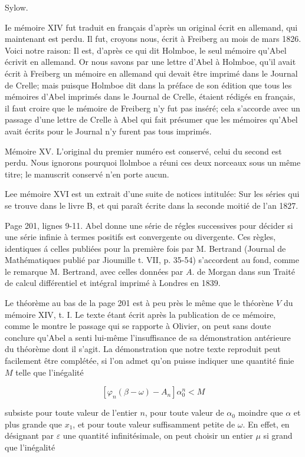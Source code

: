 \documentclass{article}
\begin{document}
Sylow.

Ie mémoire XIV fut traduit en français d'après un original écrit en allemand, qui maintenant est perdu. Il fut, croyons nous, écrit à Freiberg au mois de mars 1826. Voici notre raison: Il est, d'après ce qui dit Holmboe, le seul mémoire qu'Abel écrivit en allemand. Or nous savons par une lettre d'Abel à Holmboe, qu'il avait écrit à Freiberg un mémoire en allemand qui devait être imprimé dans le Journal de Crelle; mais puisque Holmboe dit dans la préface de son édition que tous les mémoires d'Abel imprimés dans le Journal de Crelle, étaient rédigés en français, il faut croire que le mémoire de Freiberg n'y fut pas inséré; cela s'accorde avec un passage d'une lettre de Crelle à Abel
qui fait présumer que les mémoires qu'Abel avait écrits pour le Journal n'y furent pas tous imprimés.

Mémoire XV. L'original du premier numéro est conservé, celui du second est perdu. Nous ignorons pourquoi llolmboe a réuni ces deux norceaux sous un même titre; le manuscrit conservé n'en porte aucun.

Lee mémoire XVI est un extrait d'une suite de notices intitulée: Sur les séries qui se trouve dans le livre B, et qui paraît écrite dans la seconde moitié de l'an 1827.

Page 201, lignes 9-11. Abel donne une série de régles successives pour décider si une série infinie à termes positifs est convergente ou divergente. Ces règles, identiques á celles publiées pour la première fois par M. Bertrand (Journal de Mathématiques publié par Jioumille t. VII, p. 35-54) s'accordent au fond, comme le remarque M. Bertrand, avec celles données par \(A\). de Morgan dans sun Traité de calcul différentiel et intégral imprimé à Londres en 1839.

Le théorème au bas de la page 201 est à peu près le même que le théorène \(V\) du mémoire XIV, t. I. Le texte étant écrit après la publication de ce mémoire, comme le montre le passage qui se rapporte à Olivier, on peut sans doute conclure qu'Abel a senti lui-même l'insuffisance de sa démonstration antérieure du théorème dont il s'agit. La démonstration que notre texte reproduit peut facilement être complétée, si l'on admet qu'on puisse indiquer une quantité finie \(M\) telle que l'inégalité

\[
\left[\varphi_{n}(\beta-\omega)-A_{n}\right] \alpha_{0}^{n}<M
\]

subsiste pour toute valeur de l'entier \(n\), pour toute valeur de \(\alpha_{0}\) moindre que \(\alpha\) et plus grande que \(x_{1}\), et pour toute valeur suffisamment petite de \(\omega\). En effet, en désignant par \(\varepsilon\) une quantité infinitésimale, on peut choisir un entier \(\mu\) si grand que l'inégalité
\end{document}
